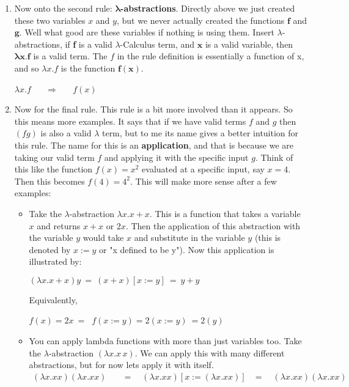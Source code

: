 \documentclass[12pt]{article}
\begin{document}
\begin{enumerate}
\item Now onto the second rule: $\boldsymbol{\lambda}$\textbf{-abstractions}. Directly above we just created these two variables $x$ and $y$, but we never actually created the functions $\mathbf{f}$ and $\mathbf{g}$. Well what good are these variables if nothing is using them. Insert $\lambda$-abstractions, if \textbf{f} is a valid $\lambda$-Calculus term, and $\mathbf{x}$ is a valid variable, then $\boldsymbol{\lambda}\mathbf{x. f}$ is a valid term. The $f$ in the rule definition is essentially a function of x, and so $\lambda x.f$ is the function $\mathbf{f(x)}$. 
\begin{center}
$\lambda x.f$ $\quad$ $\Rightarrow$ $\quad$ $f(x)$ 
\end{center}

\item Now for the final rule. This rule is a bit more involved than it appears. So this means more examples. It says that if we have valid terms $f$ and $g$ then $(fg)$ is also a valid $\lambda$ term, but to me its name gives a better intuition for this rule. The name for this is an \textbf{application}, and that is because we are taking our valid term $f$ and applying it with the specific input $g$. Think of this like the function $f(x) = x^2$ evaluated at a specific input, say $x=4$. Then this becomes $f(4) = 4^2$. This will make more sense after a few examples:
\begin{itemize}
\item Take the $\lambda$-abstraction $\lambda x.x + x$. This is a function that takes a variable $x$ and returns $x+x$ or $2x$. Then the application of this abstraction with the variable $y$ would take $x$ and substitute in the variable $y$ (this is denoted by $x:=y$ or "x defined to be y"). Now this application is illustrated by: 
\begin{center}
$(\lambda x.x + x)y \ = \ (x + x)[x:=y] \ = \ y + y$
\end{center}
Equivalently,
\begin{center}
$f(x) = 2x \ = \ $  $f(x:=y) = 2(x:=y) \ = 2(y)$
\end{center}
\item You can apply lambda functions with more than just variables too. Take the $\lambda$-abstraction $(\lambda x.x\,x)$. We can apply this with many different abstractions, but for now lets apply it with itself. 
\begin{align*}
(\lambda x.x x) (\lambda x.x x)\quad &= \quad (\lambda x.x x) [x := (\lambda x.x x)]
&= \quad (\lambda x.x x) (\lambda x.x x)

\end{align*}
\end{itemize}
\end{enumerate}
\end{document}
